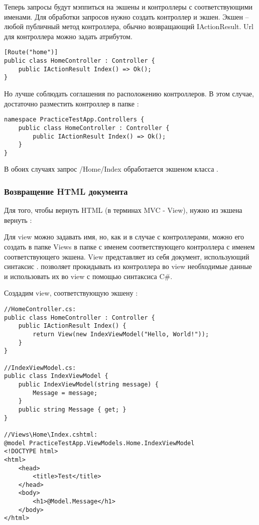 \documentclass[a4paper,14pt]{extarticle}
\begin{document}
Теперь запросы будут мэппиться на экшены и контроллеры с соответствующими
именами. Для обработки запросов нужно создать контроллер и экшен. Экшен -- любой
публичный метод контроллера, обычно возвращающий IActionResult. Url для
контроллера можно задать атрибутом.

\begin{lstlisting}
[Route("home")] 
public class HomeController : Controller {
    public IActionResult Index() => Ok();
}
\end{lstlisting}

Но лучше соблюдать соглашения по расположению контроллеров. В этом случае,
достаточно разместить контроллер в папке :

\begin{lstlisting}
namespace PracticeTestApp.Controllers { 
    public class HomeController : Controller {
        public IActionResult Index() => Ok();
    }
}
\end{lstlisting}

В обоих случаях запрос /Home/Index обработается экшеном  класса
.

\subsubsection{Возвращение HTML документа}

Для того, чтобы вернуть HTML (в терминах MVC - View), нужно из экшена вернуть
:


Для view можно задавать имя, но, как и в случае с контроллерами, можно его
создать в папке Views в папке с именем соответствующего контроллера с именем
соответствующего экшена. View представляет из себя  документ,
использующий синтаксис .  позволяет прокидывать из
контроллера во view необходимые данные и использовать их во view с помощью
синтаксиса C\#.

Создадим view, соответствующую экшену :

\begin{lstlisting}
//HomeController.cs:
public class HomeController : Controller {
    public IActionResult Index() {
        return View(new IndexViewModel("Hello, World!"));
    }
}

//IndexViewModel.cs:
public class IndexViewModel {
    public IndexViewModel(string message) {
        Message = message;
    }
    public string Message { get; }
}

//Views\Home\Index.cshtml:
@model PracticeTestApp.ViewModels.Home.IndexViewModel
<!DOCTYPE html>
<html>
    <head>
        <title>Test</title>
    </head>
    <body>
        <h1>@Model.Message</h1>
    </body>
</html>
\end{lstlisting}
\end{document}
